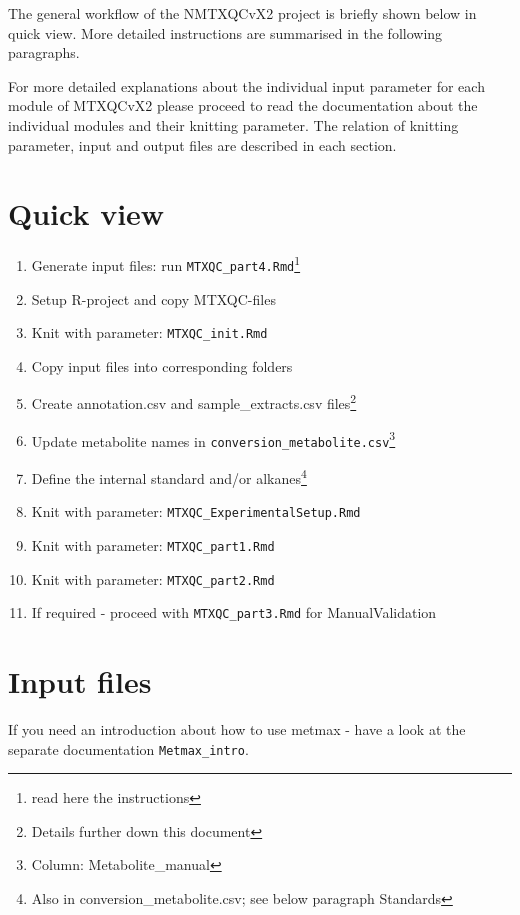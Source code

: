 \documentclass[]{book}
\providecommand{\tightlist}{%
  \setlength{\itemsep}{0pt}\setlength{\parskip}{0pt}}
\let\rmarkdownfootnote\footnote%
\def\footnote{\protect\rmarkdownfootnote}
\theoremstyle{definition}
\theoremstyle{definition}
\theoremstyle{definition}
\theoremstyle{remark}
\begin{document}
The general workflow of the NMTXQCvX2 project is briefly shown below in
quick view. More detailed instructions are summarised in the following
paragraphs.

For more detailed explanations about the individual input parameter for
each module of MTXQCvX2 please proceed to read the documentation about
the individual modules and their knitting parameter. The relation of
knitting parameter, input and output files are described in each
section.

\section{Quick view}\label{quick-view}

\begin{enumerate}
\def\labelenumi{\arabic{enumi}.}
\tightlist
\item
  Generate input files: run \texttt{MTXQC\_part4.Rmd}\footnote{read here
    the instructions}
\item
  Setup R-project and copy MTXQC-files
\item
  Knit with parameter: \texttt{MTXQC\_init.Rmd}
\item
  Copy input files into corresponding folders
\item
  Create annotation.csv and sample\_extracts.csv files\footnote{Details
    further down this document}
\item
  Update metabolite names in
  \texttt{conversion\_metabolite.csv}\footnote{Column:
    Metabolite\_manual}
\item
  Define the internal standard and/or alkanes\footnote{Also in
    conversion\_metabolite.csv; see below paragraph Standards}
\item
  Knit with parameter: \texttt{MTXQC\_ExperimentalSetup.Rmd}
\item
  Knit with parameter: \texttt{MTXQC\_part1.Rmd}
\item
  Knit with parameter: \texttt{MTXQC\_part2.Rmd}
\item
  If required - proceed with \texttt{MTXQC\_part3.Rmd} for
  ManualValidation
\end{enumerate}

\section{Input files}\label{input-files}

If you need an introduction about how to use metmax - have a look at the
separate documentation \texttt{Metmax\_intro}.
\end{document}
